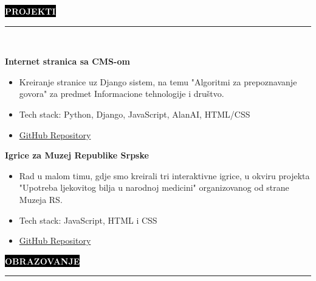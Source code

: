\documentclass[9pt]{developercv} %
\begin{document}
\colorbox{black}{{\textcolor{white}{\textbf{\MakeUppercase{Projekti}}}}}
\par\noindent\rule{\textwidth}{2px}\\

\begin{minipage}[t]{0.45\textwidth}
	\vspace{-\baselineskip}
	
	{\textbf{Internet stranica sa CMS-om}}
	\begin{itemize}
        \item Kreiranje stranice uz Django sistem, na temu "Algoritmi za prepoznavanje govora" za predmet Informacione tehnologije i društvo.
        \item Tech stack: Python, Django, JavaScript, AlanAI, HTML/CSS
        
        \item [\faExternalLink]{\href{https://github.com/vladocodes/PMF_ITAS_CMS}{GitHub Repository}}
    \end{itemize}
\end{minipage}
\hfill
\begin{minipage}[t]{0.45\textwidth}
    \vspace{-\baselineskip}
    
    {\textbf{Igrice za Muzej Republike Srpske}}
    \begin{itemize}
        \item Rad u malom timu, gdje smo kreirali tri interaktivne igrice, u okviru projekta "Upotreba ljekovitog bilja u narodnoj medicini" organizovanog od strane Muzeja RS.
        \item  Tech stack: JavaScript, HTML i CSS \smallskip \smallskip
        \item [\faExternalLink]{\href{https://github.com/vladocodes/muzej-rs}{GitHub Repository}}
    \end{itemize}
\end{minipage}

\vspace{1cm}




\colorbox{black}{{\textcolor{white}{\textbf{\MakeUppercase{Obrazovanje}}}}}
\par\noindent\rule{\textwidth}{2px}\\
        
\end{document}

